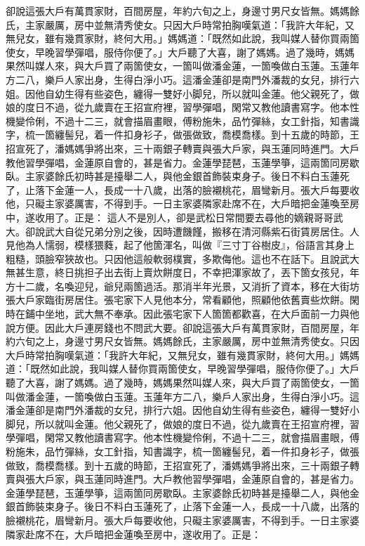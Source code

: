 卻說這張大戶有萬貫家財，百間房屋，年約六旬之上，身邊寸男尺女皆無。媽媽餘氏，主家嚴厲，房中並無清秀使女。只因大戶時常拍胸嘆氣道：「我許大年紀，又無兒女，雖有幾貫家財，終何大用。」媽媽道：「既然如此說，我叫媒人替你買兩箇使女，早晚習學彈唱，服侍你便了。」大戶聽了大喜，謝了媽媽。過了幾時，媽媽果然叫媒人來，與大戶買了兩箇使女，一箇叫做潘金蓮，一箇喚做白玉蓮。玉蓮年方二八，樂戶人家出身，生得白淨小巧。這潘金蓮卻是南門外潘裁的女兒，排行六姐。因他自幼生得有些姿色，纏得一雙好小脚兒，{}所以就叫金蓮。他父親死了，做娘的度日不過，從九歲賣在王招宣府裡，{}習學彈唱，閑常又教他讀書寫字。他本性機變伶俐，不過十二三，就會描眉畫眼，傅粉施朱，品竹彈絲，女工針指，知書識字，梳一箇纏髻兒，着一件扣身衫子，做張做致，喬模喬樣。{}到十五歲的時節，王招宣死了，潘媽媽爭將出來，三十兩銀子轉賣與張大戶家，與玉蓮同時進門。大戶教他習學彈唱，金蓮原自會的，甚是省力。金蓮學琵琶，玉蓮學箏，這兩箇同房歇臥。主家婆餘氏初時甚是擡舉二人，與他金銀首飾裝束身子。後日不料白玉蓮死了，止落下金蓮一人，長成一十八歲，出落的臉襯桃花，眉彎新月。張大戶每要收他，只礙主家婆厲害，不得到手。{}一日主家婆隣家赴席不在，大戶暗把金蓮喚至房中，遂收用了。正是：
這人不是別人，卻是武松日常間要去尋他的嫡親哥哥武大。卻說武大自從兄弟分別之後，因時遭饑饉，搬移在清河縣紫石街賃房居住。人見他為人懦弱，模樣猥蕤，起了他箇渾名，叫做『三寸丁谷樹皮』，{}俗語言其身上粗糙，頭臉窄狹故也。只因他這般軟弱樸實，多欺侮他。這也不在話下。且說武大無甚生意，終日挑担子出去街上賣炊餅度日，不幸把渾家故了，丟下箇女孩兒，年方十二歲，名喚迎兒，爺兒兩箇過活。那消半年光景，又消折了資本，移在大街坊張大戶家臨街房居住。張宅家下人見他本分，常看顧他，照顧他依舊賣些炊餅。閑時在鋪中坐地，武大無不奉承。因此張宅家下人箇箇都歡喜，在大戶面前一力與他說方便。因此大戶連房錢也不問武大要。卻說這張大戶有萬貫家財，百間房屋，年約六旬之上，身邊寸男尺女皆無。媽媽餘氏，主家嚴厲，房中並無清秀使女。只因大戶時常拍胸嘆氣道：「我許大年紀，又無兒女，雖有幾貫家財，終何大用。」媽媽道：「既然如此說，我叫媒人替你買兩箇使女，早晚習學彈唱，服侍你便了。」大戶聽了大喜，謝了媽媽。過了幾時，媽媽果然叫媒人來，與大戶買了兩箇使女，一箇叫做潘金蓮，一箇喚做白玉蓮。玉蓮年方二八，樂戶人家出身，生得白淨小巧。這潘金蓮卻是南門外潘裁的女兒，排行六姐。因他自幼生得有些姿色，纏得一雙好小脚兒，{}所以就叫金蓮。他父親死了，做娘的度日不過，從九歲賣在王招宣府裡，{}習學彈唱，閑常又教他讀書寫字。他本性機變伶俐，不過十二三，就會描眉畫眼，傅粉施朱，品竹彈絲，女工針指，知書識字，梳一箇纏髻兒，着一件扣身衫子，做張做致，喬模喬樣。{}到十五歲的時節，王招宣死了，潘媽媽爭將出來，三十兩銀子轉賣與張大戶家，與玉蓮同時進門。大戶教他習學彈唱，金蓮原自會的，甚是省力。金蓮學琵琶，玉蓮學箏，這兩箇同房歇臥。主家婆餘氏初時甚是擡舉二人，與他金銀首飾裝束身子。後日不料白玉蓮死了，止落下金蓮一人，長成一十八歲，出落的臉襯桃花，眉彎新月。張大戶每要收他，只礙主家婆厲害，不得到手。{}一日主家婆隣家赴席不在，大戶暗把金蓮喚至房中，遂收用了。正是：


